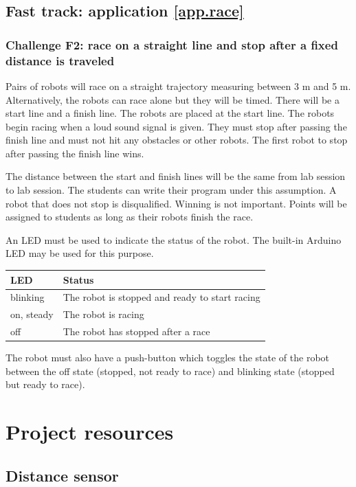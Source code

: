 \documentclass[12pt]{book}
\begin{document}
\section{Fast track: application \ref{app.race}}

\subsection{Challenge F2: race on a straight line and stop after a fixed distance is traveled}

Pairs of robots will race on a straight trajectory measuring between 3 m and 5 m. Alternatively, the robots can race alone but they will be timed. There will be a start line and a finish line. The robots are placed at the start line. The robots begin racing when a loud sound signal is given. They must stop after passing the finish line and must not hit any obstacles or other robots. The first robot to stop after passing the finish line wins.

The distance between the start and finish lines will be the same from lab session to lab session. The students can write their program under this assumption. A robot that does not stop is disqualified. Winning is not important. Points will be assigned to students as long as their robots finish the race. 

An LED must be used to indicate the status of the robot. The built-in Arduino LED may be used for this purpose.

\smallskip
\begin{tabular}{l p{8cm}}
  \toprule
  LED & Status \\
  \midrule
  blinking & The robot is stopped and ready to start racing \\
  on, steady & The robot is racing \\
  off & The robot has stopped after a race \\
  \bottomrule
\end{tabular}
\smallskip

  The robot must also have a push-button which toggles the state of the robot between the off state (stopped, not ready to race) and blinking state (stopped but ready to race).



\chapter{Project resources}\label{resource.ch}

\section{Distance sensor}
\end{document}
